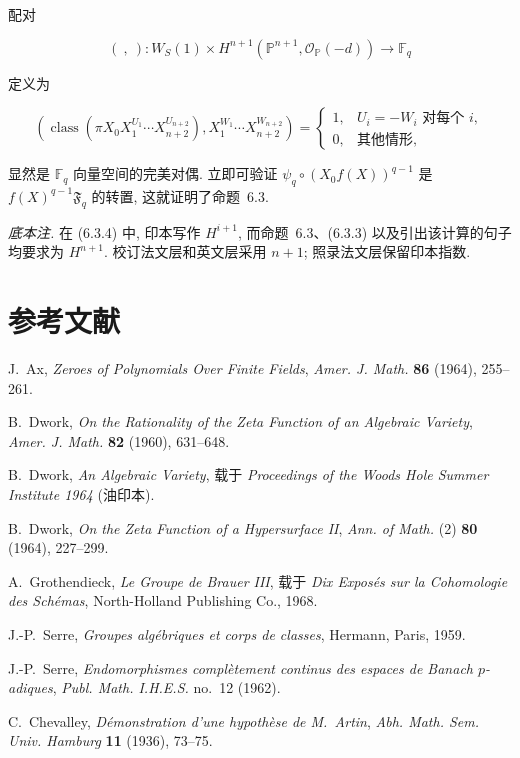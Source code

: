 配对

\begin{equation}\tag{6.3.6}
(\ ,\ ):
W_S(1)\times
H^{n+1}(\mathbb P^{n+1},\mathcal O_{\mathbb P}(-d))
\longrightarrow\mathbb F_q
\end{equation}

定义为

\begin{equation}\tag{6.3.7}
\left(
\operatorname{class}\!\left(
\pi X_0X_1^{U_1}\cdots X_{n+2}^{U_{n+2}}
\right),
X_1^{W_1}\cdots X_{n+2}^{W_{n+2}}
\right)
=
\begin{cases}
1,&U_i=-W_i\text{ 对每个 }i,\\
0,&\text{其他情形},
\end{cases}
\end{equation}

显然是 $\mathbb F_q$ 向量空间的完美对偶. 立即可验证
$\psi_q\circ(X_0f(X))^{q-1}$ 是 $f(X)^{q-1}\mathfrak F_q$ 的转置,
这就证明了命题~6.3.

\medskip
\noindent\emph{底本注.}
在 (6.3.4) 中, 印本写作 $H^{i+1}$, 而命题~6.3、(6.3.3)
以及引出该计算的句子均要求为 $H^{n+1}$.
校订法文层和英文层采用 $n+1$; 照录法文层保留印本指数.

\section*{参考文献}

\begin{enumerate}[label={[\arabic*]},leftmargin=2.4em]
\item J.~Ax, \emph{Zeroes of Polynomials Over Finite Fields},
  \emph{Amer. J. Math.} \textbf{86} (1964), 255--261.
\item B.~Dwork, \emph{On the Rationality of the Zeta Function of an Algebraic
  Variety}, \emph{Amer. J. Math.} \textbf{82} (1960), 631--648.
\item B.~Dwork, \emph{An Algebraic Variety}, 载于 \emph{Proceedings of the
  Woods Hole Summer Institute 1964} (油印本).
\item B.~Dwork, \emph{On the Zeta Function of a Hypersurface II},
  \emph{Ann. of Math.} (2) \textbf{80} (1964), 227--299.
\item A.~Grothendieck, \emph{Le Groupe de Brauer III}, 载于
  \emph{Dix Exposés sur la Cohomologie des Schémas},
  North-Holland Publishing Co., 1968.
\item J.-P.~Serre, \emph{Groupes algébriques et corps de classes},
  Hermann, Paris, 1959.
\item J.-P.~Serre, \emph{Endomorphismes complètement continus des espaces de
  Banach $p$-adiques}, \emph{Publ. Math. I.H.E.S.} no.~12 (1962).
\item C.~Chevalley, \emph{Démonstration d'une hypothèse de M.~Artin},
  \emph{Abh. Math. Sem. Univ. Hamburg} \textbf{11} (1936), 73--75.
\end{enumerate}
